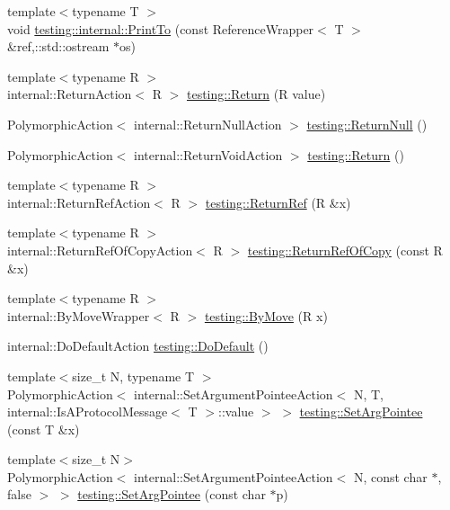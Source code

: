 \begin{DoxyCompactItemize}
\item 
{\footnotesize template$<$typename T $>$ }\\void \hyperlink{namespacetesting_1_1internal_a880d891d434f918b29a382f90e47cecb}{testing\+::internal\+::\+Print\+To} (const Reference\+Wrapper$<$ T $>$ \&ref,\+::std\+::ostream $\ast$os)
\item 
{\footnotesize template$<$typename R $>$ }\\internal\+::\+Return\+Action$<$ R $>$ \hyperlink{namespacetesting_af6d1c13e9376c77671e37545cd84359c}{testing\+::\+Return} (R value)
\item 
Polymorphic\+Action$<$ internal\+::\+Return\+Null\+Action $>$ \hyperlink{namespacetesting_aa0331596e269114da101f810d3a1b88b}{testing\+::\+Return\+Null} ()
\item 
Polymorphic\+Action$<$ internal\+::\+Return\+Void\+Action $>$ \hyperlink{namespacetesting_a8da8e53d2e7bc4e3c531f7435ad04823}{testing\+::\+Return} ()
\item 
{\footnotesize template$<$typename R $>$ }\\internal\+::\+Return\+Ref\+Action$<$ R $>$ \hyperlink{namespacetesting_a18eda8fe9c89ee856c199a2e04ca1641}{testing\+::\+Return\+Ref} (R \&x)
\item 
{\footnotesize template$<$typename R $>$ }\\internal\+::\+Return\+Ref\+Of\+Copy\+Action$<$ R $>$ \hyperlink{namespacetesting_ac1b75444c89371dc25ebcfcc48336201}{testing\+::\+Return\+Ref\+Of\+Copy} (const R \&x)
\item 
{\footnotesize template$<$typename R $>$ }\\internal\+::\+By\+Move\+Wrapper$<$ R $>$ \hyperlink{namespacetesting_acaa432211a3aec62e3d0f24b47bd2dae}{testing\+::\+By\+Move} (R x)
\item 
internal\+::\+Do\+Default\+Action \hyperlink{namespacetesting_ae041df61ff61ccb9753ba15b4309e1a6}{testing\+::\+Do\+Default} ()
\item 
{\footnotesize template$<$size\+\_\+t N, typename T $>$ }\\Polymorphic\+Action$<$ internal\+::\+Set\+Argument\+Pointee\+Action$<$ N, T, internal\+::\+Is\+A\+Protocol\+Message$<$ T $>$\+::value $>$ $>$ \hyperlink{namespacetesting_a5740a5033b88c37666fcd09a269d123f}{testing\+::\+Set\+Arg\+Pointee} (const T \&x)
\item 
{\footnotesize template$<$size\+\_\+t N$>$ }\\Polymorphic\+Action$<$ internal\+::\+Set\+Argument\+Pointee\+Action$<$ N, const char $\ast$, false $>$ $>$ \hyperlink{namespacetesting_a4a190fd2d02fb7cd79c5b3df3f80b647}{testing\+::\+Set\+Arg\+Pointee} (const char $\ast$p)

\end{DoxyCompactItemize}
